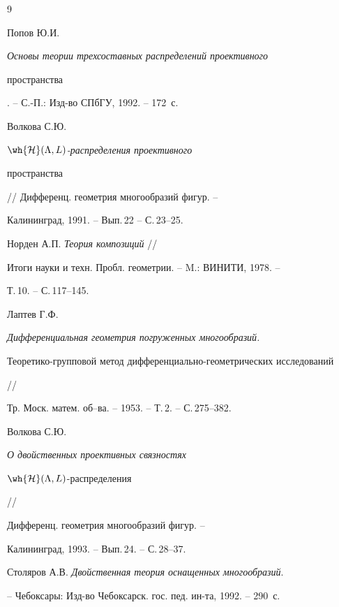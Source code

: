 \begin{thebibliography}{9}







Попов Ю.И. {\em Основы теории трехсоставных распределений проективного


пространства}. -- С.-П.: Изд-во СПбГУ, 1992. -- 172~с.




Волкова С.Ю. {\em $\wh{\cal H}(\Lambda, L)$-распределения проективного


пространства} // Дифференц. геометрия многообразий фигур. --


Калининград, 1991. -- Вып.\,22 -- С.\,23--25.




Норден А.П. {\em Теория композиций} //


Итоги науки и техн. Пробл. геометрии. -- M.: ВИНИТИ, 1978. --


Т.\,10. -- С.\,117--145.




Лаптев Г.Ф. {\em Дифференциальная геометрия погруженных многообразий.


Теоретико-групповой метод дифференциально-геометрических исследований} //


Тр. Моск. матем. об--ва. -- 1953. -- Т.\,2. -- С.\,275--382.




Волкова С.Ю. {\em О двойственных проективных связностях


$\wh{\cal H}(\Lambda, L)$-распределения} //


Дифференц. геометрия многообразий фигур. --


Калининград, 1993. -- Вып.\,24. -- С.\,28--37.




Столяров А.В. {\em Двойственная теория оснащенных многообразий}.


-- Чебоксары: Изд-во Чебоксарск. гос. пед. ин-та, 1992. -- 290~с.





\end{thebibliography}





\vskip 0.5cm














\label{end}





